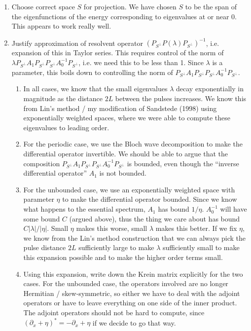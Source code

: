 \documentclass[12pt]{article}
\begin{document}
\begin{enumerate}
\item Choose correct space $S$ for projection. We have chosen $S$ to be the span of the eigenfunctions of the energy corresponding to eigenvalues at or near 0. This appears to work really well.

\item Justify approximation of resolvent operator $( P_{S^\perp} P(\lambda) P_{S^\perp})^{-1}$, i.e. expansion of this in Taylor series. This requires control of the norm of $\lambda P_{S^\perp} A_1 P_{S^\perp}P_{S^\perp}A_0^{-1}P_{S^\perp}$, i.e. we need this to be less than 1. Since $\lambda$ is a parameter, this boils down to controlling the norm of $P_{S^\perp} A_1 P_{S^\perp}P_{S^\perp}A_0^{-1}P_{S^\perp}$.

\begin{enumerate}
	\item In all cases, we know that the small eigenvalues $\lambda$ decay exponentially in magnitude as the distance $2L$ between the pulses increases. We know this from Lin's method / my modification of Sandstede (1998) using exponentially weighted spaces, where we were able to compute these eigenvalues to leading order. 

	\item For the periodic case, we use the Bloch wave decomposition to make the differential operator invertible. We should be able to argue that the composition $P_{S^\perp} A_1 P_{S^\perp}P_{S^\perp}A_0^{-1}P_{S^\perp}$ is bounded, even though the ``inverse differential operator'' $A_1$ is not bounded.

	\item For the unbounded case, we use an exponentially weighted space with parameter $\eta$ to make the differential operator bounded. Since we know what happens to the essential spectrum, $A_1$ has bound $1/\eta$. $A_0^{-1}$ will have some bound $C$ (argued above), thus the thing we care about has bound $C |\lambda|/|\eta|$. Small $\eta$ makes this worse, small $\lambda$ makes this better. If we fix $\eta$, we know from the Lin's method construction that we can always pick the pulse distance $2L$ sufficiently large to make $\lambda$ sufficiently small to make this expansion possible and to make the higher order terms small.

	\item Using this expansion, write down the Krein matrix explicitly for the two cases. For the unbounded case, the operators involved are no longer Hermitian / skew-symmetric, so either we have to deal with the adjoint operators or have to leave everything on one side of the inner product. The adjoint operators should not be hard to compute, since $(\partial_x + \eta)^* = -\partial_x + \eta$ if we decide to go that way.
\end{enumerate}


\end{enumerate}
\end{document}
